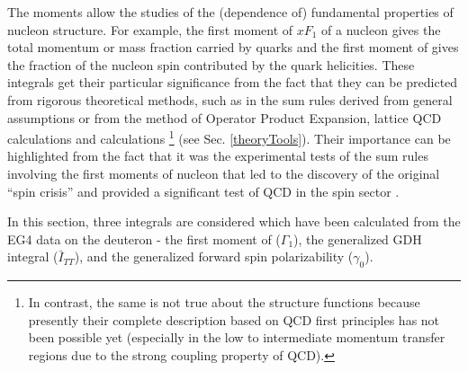 The moments allow the studies of the (\qsqs dependence of) fundamental properties of nucleon %
structure. For example, the first moment of $x F_1$ %
of a nucleon gives the total momentum or mass fraction carried by quarks and the first moment of \gones gives the fraction of the nucleon spin contributed by the quark helicities. %
These integrals get their particular significance from the fact that they can be predicted from rigorous theoretical methods, such as in the sum rules derived from general assumptions or from the method of Operator Product Expansion, lattice QCD calculations and \chipts calculations \footnote{In contrast, the same is not true about the structure functions because presently their complete description %
based on QCD first principles %
has not been possible yet (especially in the low to intermediate momentum transfer regions due to the strong coupling property of QCD).} (see Sec. \ref{theoryTools}). %
Their importance can be highlighted from the fact that it was the experimental tests of the sum rules involving the first moments of nucleon that led to the discovery of the original ``spin crisis'' and provided a significant test of QCD in the spin sector  \cite{pLeaderKuhnChen}. %

In this section, three integrals are considered which have been calculated from the EG4 data on the deuteron - the first moment of \gones ($\Gamma_1$), the generalized GDH integral ($\bar{I}_{TT}$), and the generalized forward spin polarizability ($\gamma_0$). 

